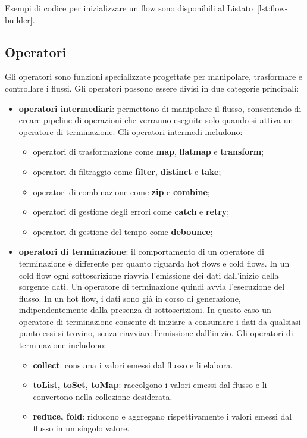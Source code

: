 \documentclass[12pt,a4paper,openright,twoside]{book}
\begin{document}
Esempi di codice per inizializzare un flow sono disponibili al Listato~\ref{lst:flow-builder}.



\subsection{Operatori}
Gli operatori sono funzioni specializzate progettate per manipolare, trasformare e controllare i flussi. Gli operatori possono essere divisi in due categorie principali: 
\begin{itemize}
    \item \textbf{operatori intermediari}: permettono di manipolare il flusso, consentendo di creare pipeline di operazioni che verranno eseguite solo quando si attiva un operatore di terminazione. Gli operatori intermedi includono: 
    \begin{itemize}
        \item operatori di trasformazione come \textbf{map}, \textbf{flatmap} e \textbf{transform}; 
        \item operatori di filtraggio come \textbf{filter}, \textbf{distinct} e \textbf{take}; 
        \item operatori di combinazione come \textbf{zip} e \textbf{combine};
        \item operatori di gestione degli errori come \textbf{catch} e \textbf{retry};
        \item operatori di gestione del tempo come \textbf{debounce};
    
    \end{itemize}
    \item \textbf{operatori di terminazione}: il comportamento di un operatore di terminazione è differente per quanto riguarda hot flows e cold flows. In un cold flow ogni sottoscrizione riavvia l'emissione dei dati dall'inizio della sorgente dati. Un operatore di terminazione quindi avvia l'esecuzione del flusso. In un hot flow, i dati sono già in corso di generazione, indipendentemente dalla presenza di sottoscrizioni. In questo caso un operatore di terminazione consente di iniziare a consumare i dati da qualsiasi punto essi si trovino, senza riavviare l'emissione dall'inizio. 
    Gli operatori di terminazione includono: 
    \begin{itemize}
        \item \textbf{collect}: consuma i valori emessi dal flusso e li elabora. 
        \item \textbf{toList, toSet, toMap}: raccolgono i valori emessi dal flusso e li convertono nella collezione desiderata. 
        \item \textbf{reduce, fold}: riducono e aggregano rispettivamente i valori emessi dal flusso in un singolo valore. 
    \end{itemize}
\end{itemize}
\end{document}

